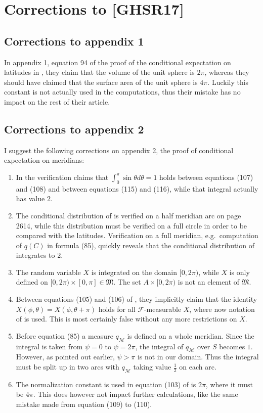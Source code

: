 \documentclass[a4paper]{report}
\theoremstyle{plain}
\theoremstyle{definition}
\theoremstyle{remark}
\numberwithin{equation}{chapter}
\DeclareMathOperator{\1}{\mathbbm{1}}
\newcommand{\F}{\mathcal{F}}
\begin{document}



\appendix
\chapter{Corrections to [GHSR17]}
\section{Corrections to appendix 1}\label{app:CorLong}
In appendix 1, equation 94 of the proof of the conditional expectation on latitudes in \cite{Gyenis17}, they claim that the volume of the unit sphere is $2\pi$, whereas they should have claimed that the surface area of the unit sphere is $4\pi$. Luckily this constant is not actually used in the computations, thus their mistake has no impact on the rest of their article.

\section{Corrections to appendix 2}\label{app:CorMer}
I suggest the following corrections on appendix 2, the proof of conditional expectation on meridians:
\begin{enumerate}
\item In the verification \cite{Gyenis17} claims that $\int_0^\pi\sin\theta d\theta=1$ holds between equations (107) and (108) and between equations (115) and (116), while that integral actually has value $2$.
\item The conditional distribution of \cite{Gyenis17} is verified on a half meridian arc on page 2614, while this distribution must be verified on a full circle in order to be compared with the latitudes. Verification on a full meridian, e.g.~computation of $q(C)$ in formula (85), quickly reveals that the conditional distribution of \cite{Gyenis17} integrates to $2$.
\item The random variable $X$ is integrated on the domain $[0,2\pi)$, while $X$ is only defined on $[0,2\pi)\times[0,\pi]\in\mathfrak{M}$. The set $A\times[0,2\pi)$ is not an element of $\mathfrak{M}$.
\item Between equations (105) and (106) of \cite{Gyenis17}, they implicitly claim that the identity $X(\phi,\theta)=X(\phi,\theta+\pi)$ holds for all $\F$-measurable $X$, where now notation of \cite{Gyenis17} is used. This is most certainly false without any more restrictions on $X$.
\item Before equation (85) a measure $q_\mathcal{M}$ is defined on a whole meridian. Since the integral is taken from $\psi=0$ to $\psi=2\pi$, the integral of $q_\mathcal{M}$ over $S$ becomes $1$. However, as pointed out earlier, $\psi>\pi$ is not in our domain. Thus the integral must be split up in two arcs with $q_{\mathcal{M}}$ taking value $\frac{1}{2}$ on each arc.
\item The normalization constant is used in equation (103) of \cite{Gyenis17} is $2\pi$, where it must be $4\pi$. This does however not impact further calculations, like the same mistake made from equation (109) to (110).
\end{enumerate}

\newpage

\printindex
\end{document}

